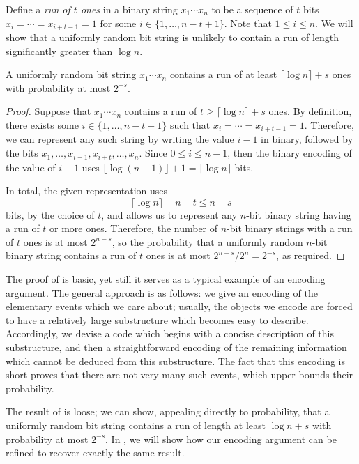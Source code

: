 Define a \emph{run of $t$ ones} in a binary string $x_1 \cdots x_n$ to
be a sequence of $t$ bits $x_i = \cdots = x_{i + t - 1} = 1$ for some
$i \in \{1, \ldots, n - t + 1\}$. Note that $1 \leq i \leq n$. We will
show that a uniformly random bit string is unlikely to contain a run
of length significantly greater than $\log n$.
\begin{prop}
  A uniformly random bit string $x_1 \cdots x_n$ contains a run of at
  least $\lceil \log n \rceil + s$ ones with probability at most
  $2^{-s}$.
\end{prop}
\begin{proof}
  Suppose that $x_1 \cdots x_n$ contains a run of $t \geq \lceil \log
  n \rceil + s$ ones. By definition, there exists some $i \in \{1,
  \ldots, n - t + 1\}$ such that $x_i = \cdots = x_{i + t - 1} =
  1$. Therefore, we can represent any such string by writing the value
  $i - 1$ in binary, followed by the bits $x_1, \ldots, x_{i - 1},
  x_{i + t}, \ldots, x_n$. Since $0 \leq i \leq n - 1$, then the
  binary encoding of the value of $i - 1$ uses $\lfloor \log (n - 1)
  \rfloor + 1 = \lceil \log n \rceil$ bits.

  In total, the given representation uses
  \[
  \lceil \log n \rceil + n - t \leq n - s
  \]
  bits, by the choice of $t$, and allows us to represent any $n$-bit
  binary string having a run of $t$ or more ones. Therefore, the
  number of $n$-bit binary strings with a run of $t$ ones is at most
  $2^{n - s}$, so the probability that a uniformly random $n$-bit
  binary string contains a run of $t$ ones is at most $2^{n - s}/2^n =
  2^{-s}$, as required.
\end{proof}

The proof of  is basic, yet still it serves as a
typical example of an encoding argument. The general approach is as
follows: we give an encoding of the elementary events which we care
about; usually, the objects we encode are forced to have a relatively
large substructure which becomes easy to describe. Accordingly, we
devise a code which begins with a concise description of this
substructure, and then a straightforward encoding of the remaining
information which cannot be deduced from this substructure. The fact
that this encoding is short proves that there are not very many such
events, which upper bounds their probability.

The result of  is loose; we can show, appealing
directly to probability, that a uniformly random bit string contains a
run of length at least $\log n + s$ with probability at most
$2^{-s}$. In , we will show how our encoding argument can be
refined to recover exactly the same result.

